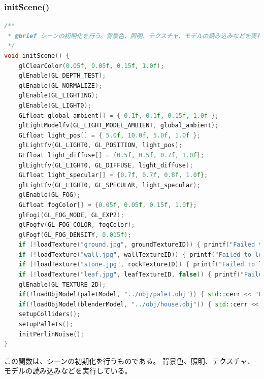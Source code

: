 \documentclass[uplatex,dvipdfmx,a4paper]{jsarticle}
\begin{document}
\hypertarget{func:initScene}{}\subsubsection{initScene()}\label{func:initScene}
\begin{lstlisting}[language=C++, caption={initScene() 関数}, label={lst:initScene_detail}]
/**
 * @brief シーンの初期化を行う。背景色、照明、テクスチャ、モデルの読み込みなどを実行する。
 */
void initScene() {
    glClearColor(0.05f, 0.05f, 0.15f, 1.0f);
    glEnable(GL_DEPTH_TEST);
    glEnable(GL_NORMALIZE);
    glEnable(GL_LIGHTING);
    glEnable(GL_LIGHT0);
    GLfloat global_ambient[] = { 0.1f, 0.1f, 0.15f, 1.0f };
    glLightModelfv(GL_LIGHT_MODEL_AMBIENT, global_ambient);
    GLfloat light_pos[] = { 5.0f, 10.0f, 5.0f, 1.0f };
    glLightfv(GL_LIGHT0, GL_POSITION, light_pos);
    GLfloat light_diffuse[] = {0.5f, 0.5f, 0.7f, 1.0f};
    glLightfv(GL_LIGHT0, GL_DIFFUSE, light_diffuse);
    GLfloat light_specular[] = {0.7f, 0.7f, 0.8f, 1.0f};
    glLightfv(GL_LIGHT0, GL_SPECULAR, light_specular);
    glEnable(GL_FOG);
    GLfloat fogColor[] = {0.05f, 0.05f, 0.15f, 1.0f};
    glFogi(GL_FOG_MODE, GL_EXP2);
    glFogfv(GL_FOG_COLOR, fogColor);
    glFogf(GL_FOG_DENSITY, 0.015f);
    if (!loadTexture("ground.jpg", groundTextureID)) { printf("Failed to load ground texture.\n"); }
    if (!loadTexture("wall.jpg", wallTextureID)) { printf("Failed to load wall texture.\n"); }
    if (!loadTexture("stone.jpg", rockTextureID)) { printf("Failed to load rock texture.\n"); }
    if (!loadTexture("leaf.jpg", leafTextureID, false)) { printf("Failed to load leaf texture.\n"); }
    glEnable(GL_TEXTURE_2D);
    if(!loadObjModel(paletModel, "../obj/palet.obj")) { std::cerr << "Failed to load palet.obj" << std::endl; }
    if(!loadObjModel(blenderModel, "../obj/house.obj")) { std::cerr << "Failed to load house.obj" << std::endl; }
    setupColliders();
    setupPallets();
    initPerlinNoise();
}
\end{lstlisting}
この関数は、シーンの初期化を行うものである。
背景色、照明、テクスチャ、モデルの読み込みなどを実行している。
\end{document}
